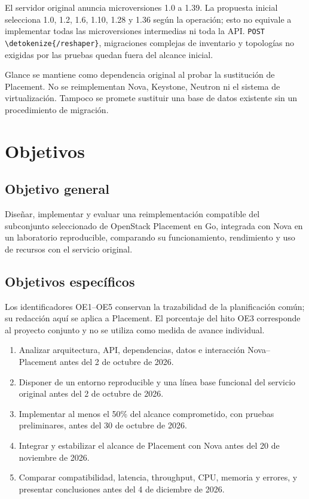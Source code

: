 \documentclass[12pt,a4paper]{article}
\newcommand{\code}[1]{{\small\expandafter\nolinkurl\expandafter{\detokenize{#1}}}}
\begin{document}
El servidor original anuncia microversiones 1.0 a 1.39. La propuesta inicial selecciona 1.0, 1.2, 1.6, 1.10, 1.28 y 1.36 según la operación; esto no equivale a implementar todas las microversiones intermedias ni toda la API. \texttt{\small POST}\,\code{/reshaper}, migraciones complejas de inventario y topologías no exigidas por las pruebas quedan fuera del alcance inicial.

Glance se mantiene como dependencia original al probar la sustitución de Placement. No se reimplementan Nova, Keystone, Neutron ni el sistema de virtualización. Tampoco se promete sustituir una base de datos existente sin un procedimiento de migración.

\Needspace{165pt}
\section{Objetivos}
\subsection{Objetivo general}
Diseñar, implementar y evaluar una reimplementación compatible del subconjunto seleccionado de OpenStack Placement en Go, integrada con Nova en un laboratorio reproducible, comparando su funcionamiento, rendimiento y uso de recursos con el servicio original.

\subsection{Objetivos específicos}
Los identificadores OE1--OE5 conservan la trazabilidad de la planificación común; su redacción aquí se aplica a Placement. El porcentaje del hito OE3 corresponde al proyecto conjunto y no se utiliza como medida de avance individual.
\begin{enumerate}[label=\textbf{OE\arabic*.}]
\item Analizar arquitectura, API, dependencias, datos e interacción Nova--Placement antes del 2 de octubre de 2026.
\item Disponer de un entorno reproducible y una línea base funcional del servicio original antes del 2 de octubre de 2026.
\item Implementar al menos el 50\% del alcance comprometido, con pruebas preliminares, antes del 30 de octubre de 2026.
\item Integrar y estabilizar el alcance de Placement con Nova antes del 20 de noviembre de 2026.
\item Comparar compatibilidad, latencia, throughput, CPU, memoria y errores, y presentar conclusiones antes del 4 de diciembre de 2026.
\end{enumerate}
\end{document}
